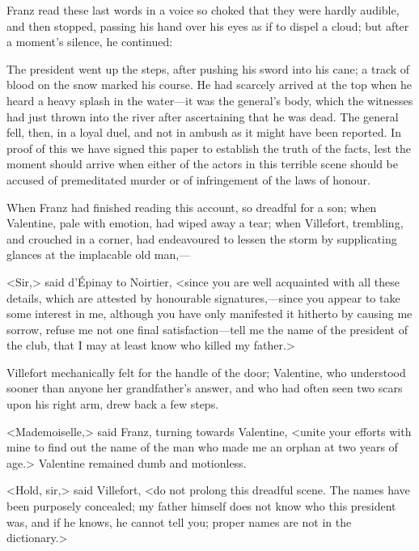  Franz read these last words in a voice so choked that they were hardly audible, and then stopped, passing his hand over his eyes as if to dispel a cloud; but after a moment's silence, he continued: 

\begin{mail}{}{}
The president went up the steps, after pushing his sword into his cane; a track of blood on the snow marked his course. He had scarcely arrived at the top when he heard a heavy splash in the water—it was the general's body, which the witnesses had just thrown into the river after ascertaining that he was dead. The general fell, then, in a loyal duel, and not in ambush as it might have been reported. In proof of this we have signed this paper to establish the truth of the facts, lest the moment should arrive when either of the actors in this terrible scene should be accused of premeditated murder or of infringement of the laws of honour. 

\end{mail}

 When Franz had finished reading this account, so dreadful for a son; when Valentine, pale with emotion, had wiped away a tear; when Villefort, trembling, and crouched in a corner, had endeavoured to lessen the storm by supplicating glances at the implacable old man,— 

 <Sir,> said d'Épinay to Noirtier, <since you are well acquainted with all these details, which are attested by honourable signatures,—since you appear to take some interest in me, although you have only manifested it hitherto by causing me sorrow, refuse me not one final satisfaction—tell me the name of the president of the club, that I may at least know who killed my father.> 

 Villefort mechanically felt for the handle of the door; Valentine, who understood sooner than anyone her grandfather's answer, and who had often seen two scars upon his right arm, drew back a few steps. 

 <Mademoiselle,> said Franz, turning towards Valentine, <unite your efforts with mine to find out the name of the man who made me an orphan at two years of age.> Valentine remained dumb and motionless. 

 <Hold, sir,> said Villefort, <do not prolong this dreadful scene. The names have been purposely concealed; my father himself does not know who this president was, and if he knows, he cannot tell you; proper names are not in the dictionary.> 

